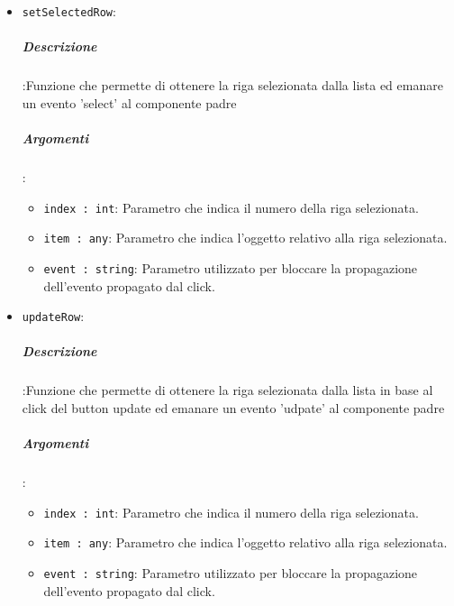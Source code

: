 \documentclass[../DefinizioneDiProdotto_v3.0.0.tex]{subfiles}
\begin{document}
			      	      \begin{itemize}
			      	      	\item \texttt{setSelectedRow}:
							\subparagraph{Descrizione}:Funzione che permette di ottenere la riga selezionata dalla lista ed emanare un evento 'select' al componente padre
			      	      	\subparagraph{Argomenti}:
			      	      	      \begin{itemize}
			      	      	      	\item \texttt{index : int}: Parametro che indica il numero della riga selezionata.
			      	      	      	\item \texttt{item : any}: Parametro che indica l'oggetto relativo alla riga selezionata.
			      	      	      	\item \texttt{event : string}: Parametro utilizzato per bloccare la propagazione dell'evento propagato dal click.
			      	      	      \end{itemize}
			      	      	\item \texttt{updateRow}:
							\subparagraph{Descrizione}:Funzione che permette di ottenere la riga selezionata dalla lista in base al click del button update ed emanare un evento 'udpate' al componente padre
			      	      	\subparagraph{Argomenti}:
			      	      	      \begin{itemize}
			      	      	      	\item \texttt{index : int}: Parametro che indica il numero della riga selezionata.
			      	      	      	\item \texttt{item : any}: Parametro che indica l'oggetto relativo alla riga selezionata.
			      	      	      	\item \texttt{event : string}: Parametro utilizzato per bloccare la propagazione dell'evento propagato dal click.
			      	      	      \end{itemize}


\end{itemize}
\end{document}
